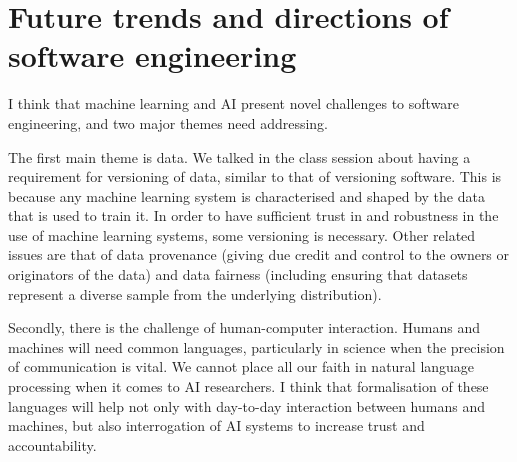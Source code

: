 \documentclass[11pt]{article}
\begin{document}
\section{Future trends and directions of software engineering}

I think that machine learning and AI present novel challenges to software engineering, and two major themes need addressing.

The first main theme is data. We talked in the class session about having a requirement for versioning of data, similar to that of versioning software. This is because any machine learning system is characterised and shaped by the data that is used to train it. In order to have sufficient trust in and robustness in the use of machine learning systems, some versioning is necessary. Other related issues are that of data provenance (giving due credit and control to the owners or originators of the data) and data fairness (including ensuring that datasets represent a diverse sample from the underlying distribution).

Secondly, there is the challenge of human-computer interaction. Humans and machines will need common languages, particularly in science when the precision of communication is vital. We cannot place all our faith in natural language processing when it comes to AI researchers. I think that formalisation of these languages will help not only with day-to-day interaction between humans and machines, but also interrogation of AI systems to increase trust and accountability.
\end{document}
